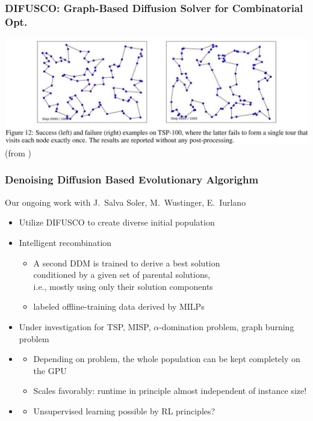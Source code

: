 \documentclass[aspectratio=1610]{beamer}
\newcommand{\important}[1]{{\color{green!60!black}#1}}
\begin{document}
\begin{frame}
	\frametitle{DIFUSCO: Graph-Based Diffusion Solver for Combinatorial Opt.}

	\begin{center}
		\includegraphics[width=\textwidth]{graphics/difusco2.jpg}
		(from \citet{sun-23})
	\end{center}
\end{frame}

	
\begin{frame}
	\frametitle{Denoising Diffusion Based Evolutionary Algorighm}

	Our ongoing work with J.~Salva Soler, M.~Wustinger, E.~Iurlano

	\bigskip
	\begin{itemize}
		\itemsep2ex
		\item Utilize DIFUSCO to create diverse initial population
		\item \important{Intelligent recombination} 
		\begin{itemize}
			\item A second DDM is trained to derive a best solution\\ conditioned by a given set of parental solutions,\\
			i.e., mostly using only their solution components
			\item labeled offline-training data derived by MILPs
		\end{itemize}
		\item Under investigation for TSP, MISP, $\alpha$-domination problem, graph burning problem
		\item<2> 
		\begin{itemize}
			\item Depending on problem, the \important{whole population can be kept completely on the GPU}
			\item Scales favorably: \important{runtime in principle almost independent of instance size!}
		\end{itemize} 
		\item<3> 
		\begin{itemize}
			\item Unsupervised learning possible by RL principles?
		\end{itemize}
	\end{itemize}
\end{frame}
\end{document}

